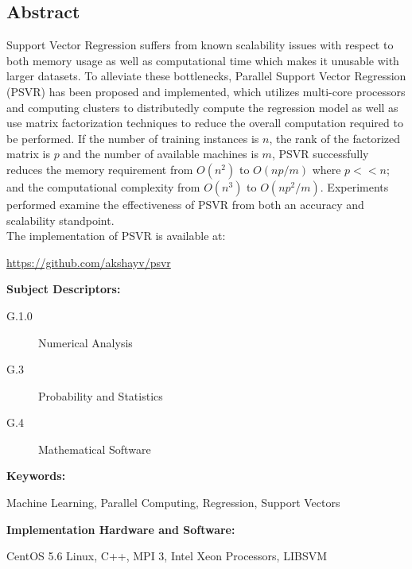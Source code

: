 \documentclass[12pt]{article}
\begin{document}
\begin{center}
\section*{Abstract}
%
\end{center}
\begin{adjustwidth}{2 cm}{2 cm} 
Support Vector Regression suffers from known scalability issues with respect to both memory usage as well as computational time which makes it unusable with larger datasets. To alleviate these bottlenecks, Parallel Support Vector Regression (PSVR) has been proposed and implemented, which utilizes multi-core processors and computing clusters to distributedly compute the regression model as well as use matrix factorization techniques to reduce the overall computation required to be performed. If the number of training instances is $n$, the rank of the factorized matrix is $p$ and the number of available machines is $m$, PSVR successfully reduces the memory requirement from $O(n^2)$ to $O(np/m)$ where $p << n$; and the computational complexity from $O(n^3)$ to $O(np^2/m)$. Experiments performed examine the effectiveness of PSVR from both an accuracy and scalability standpoint.\\
The implementation of PSVR is available at:
\begin{center}
 \url{https://github.com/akshayv/psvr}
 \end{center}
\end{adjustwidth}
\vspace{1 cm} 

\begin{adjustwidth}{0 cm}{0 cm}
{\bf Subject Descriptors:} 
\end{adjustwidth}
\begin{adjustwidth}{2 cm}{2 cm}
\begin{description}
\item[G.1.0]	 Numerical Analysis
\item[G.3]    Probability and Statistics
\item[G.4] Mathematical Software
\end{description}
\end{adjustwidth}
{\bf Keywords:} 
\begin{adjustwidth}{2 cm}{2 cm}
Machine Learning, Parallel Computing, Regression, Support Vectors\\
\end{adjustwidth} 
{\bf Implementation Hardware and Software:}
\begin{adjustwidth}{2 cm}{2 cm}
CentOS 5.6 Linux, C++, MPI 3, Intel Xeon Processors, LIBSVM
\end{adjustwidth} 
\newpage
\end{document}
